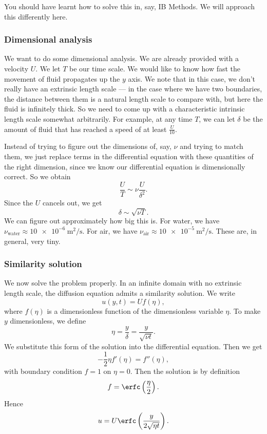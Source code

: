 \documentclass[a4paper]{article}
\begin{document}
You should have learnt how to solve this in, say, IB Methods. We will approach this differently here.
\subsubsection{Dimensional analysis}
We want to do some dimensional analysis. We are already provided with a velocity $U$. We let $T$ be our time scale. We would like to know how fast the movement of fluid propagates up the $y$ axis. We note that in this case, we don't really have an extrinsic length scale --- in the case where we have two boundaries, the distance between them is a natural length scale to compare with, but here the fluid is infinitely thick. So we need to come up with a characteristic intrinsic length scale somewhat arbitrarily. For example, at any time $T$, we can let $\delta$ be the amount of fluid that has reached a speed of at least $\frac{U}{10}$.

Instead of trying to figure out the dimensions of, say, $\nu$ and trying to match them, we just replace terms in the differential equation with these quantities of the right dimension, since we know our differential equation is dimensionally correct. So we obtain
\[
  \frac{U}{T} \sim \nu \frac{U}{\delta^2}.
\]
Since the $U$ cancels out, we get
\[
  \delta \sim \sqrt{\nu T}.
\]
We can figure out approximately how big this is. For water, we have $\nu_{\mathrm{water}} \approx \SI{10e-6}{\meter\squared\per\second}$. For air, we have $\nu_{\mathrm{air}} \approx \SI{10e-5}{\meter\squared\per\second}$. These are, in general, very tiny.
\subsubsection{Similarity solution}
We now solve the problem properly. In an infinite domain with no extrinsic length scale, the diffusion equation admits a similarity solution. We write
\[
  u(y, t) = U f(\eta),
\]
where $f(\eta)$ is a dimensionless function of the dimensionless variable $\eta$. To make $y$ dimensionless, we define
\[
  \eta = \frac{y}{\delta} = \frac{y}{\sqrt{\nu t}}.
\]
We substitute this form of the solution into the differential equation. Then we get
\[
  -\frac{1}{2} \eta f'(\eta) = f''(\eta),
\]
with boundary condition $f = 1$ on $\eta = 0$. Then the solution is by definition
\[
  f = \erfc \left(\frac{\eta}{2}\right).
\]
Hence
\[
  u = U \erfc \left(\frac{y}{2\sqrt{\eta t}}\right).
\]
\begin{center}
\end{center}
\end{document}

